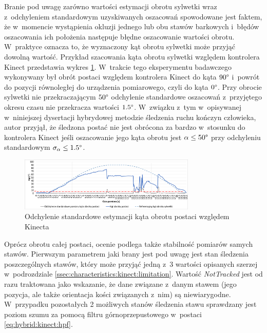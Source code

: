 Branie pod uwagę zarówno wartości estymacji obrotu sylwetki 
wraz z~odchyleniem standardowym uzyskiwanych oszacowań spowodowane jest faktem, że w~momencie wystąpienia okluzji jednego lub obu stawów barkowych i~błędów oszacowania ich położenia następuje błędne oszacowanie wartości obrotu. W~praktyce oznacza to, że wyznaczony kąt obrotu sylwetki może przyjąć dowolną wartość. Przykład szacowania kąta obrotu sylwetki względem kontrolera Kinect przedstawia wykres \ref{fig:hybrid:kinect:kinectRotationVariance}. W~trakcie tego eksperymentu badawczego wykonywany był obrót postaci względem kontrolera Kinect do kąta $90\degree$ i~powrót do pozycji równoległej do urządzenia pomiarowego, czyli do kąta $0\degree$. Przy obrocie sylwetki nie przekraczającym $50\degree$ odchylenie standardowe oszacowań z~przyjętego okresu czasu nie przekracza wartości $1.5\degree$. W~związku z~tym w~opisywanej w~niniejszej dysertacji hybrydowej metodzie śledzenia ruchu kończyn człowieka, autor przyjął, że śledzona postać nie jest obrócona za bardzo w~stosunku do kontrolera Kinect jeśli oszacowanie jego kąta obrotu jest $\alpha \le 50\degree$ przy odchyleniu standardowym $\sigma_\alpha\le 1.5 \degree$.

\begin{figure}[!htp]
	\centering
												
	\includegraphics[width=0.75\textwidth]{images/kinectRotationStdDev.png}
	\caption{Odchylenie standardowe estymacji kąta obrotu postaci względem Kinecta}
											
	\label{fig:hybrid:kinect:kinectRotationVariance}
\end{figure}

Oprócz obrotu całej postaci, ocenie podlega także stabilność pomiarów samych stawów. Pierwszym parametrem jaki brany jest pod uwagę jest stan śledzenia poszczególnych stawów, który może przyjąć jedną z~3 wartości opisanych szerzej w~podrozdziale \ref{ssec:characteristics:kinect:limitation}. Wartość \emph{NotTracked} jest od razu traktowana jako wskazanie, że dane związane z~danym stawem (jego pozycja, ale także orientacja kości związanych z~nim) są niewiarygodne. W~przypadku pozostałych 2 możliwych stanów śledzenia stawu sprawdzany jest poziom szumu za pomocą filtru górnoprzepustowego w~postaci \eqref{eq:hybrid:kinect:hpf}. 

